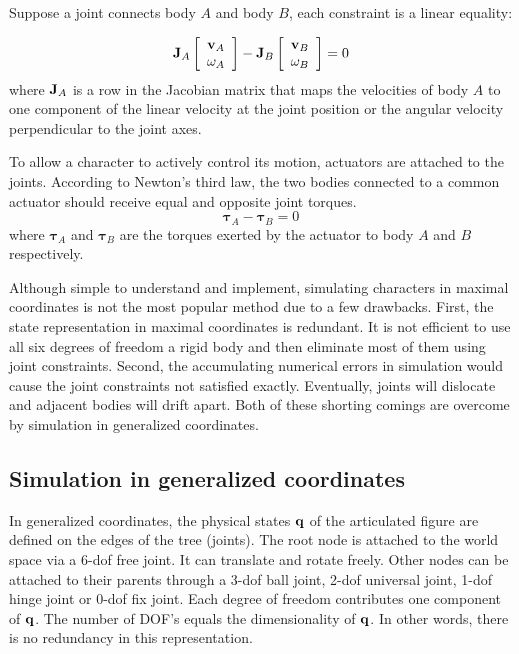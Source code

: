 Suppose a joint connects body $A$ and body $B$, each constraint is a linear equality:

\begin{equation}
\vc{J}_A
\left[\begin{array}{c}
\vc{v}_A \\
\vc{\omega}_A
\end{array}\right]-
\vc{J}_B
\left[\begin{array}{c}
\vc{v}_B \\
\vc{\omega}_B
\end{array}\right]
=0
\label{eq:jointConstraint}
\end{equation}
where $\mathbf{J}_A$ is a row in the Jacobian matrix that maps the velocities of body $A$ to one component of the linear velocity at the joint position or the angular velocity perpendicular to the joint axes.

To allow a character to actively control its motion, actuators are attached to the joints. According to Newton's third law, the two bodies connected to a common actuator should receive equal and opposite joint torques.
\begin{equation}
\boldsymbol{\tau}_A-\boldsymbol{\tau}_B=0
\label{eq:actuatorConstraint}
\end{equation}
where $\boldsymbol{\tau}_A$ and $\boldsymbol{\tau}_B$ are the torques exerted by the actuator to body $A$ and $B$ respectively.

Although simple to understand and implement, simulating characters in maximal coordinates is not the most popular method due to a few drawbacks. First, the state representation in  maximal coordinates is redundant. It is not efficient to use all six degrees of freedom a rigid body and then eliminate most of them using joint constraints. Second, the accumulating numerical errors in simulation would cause the joint constraints not satisfied exactly. Eventually, joints will dislocate and adjacent bodies will drift apart. Both of these shorting comings are overcome by simulation in generalized coordinates.

\subsection{Simulation in generalized coordinates}
In generalized coordinates, the physical states $\mathbf{q}$ of the articulated figure are defined on the edges of the tree (joints). The root node is attached to the world space via a 6-dof free joint. It can translate and rotate freely. Other nodes can be attached to their parents through a 3-dof ball joint, 2-dof universal joint, 1-dof hinge joint or 0-dof fix joint. Each degree of freedom contributes one component of $\mathbf{q}$. The number of DOF's equals the dimensionality of $\mathbf{q}$. In other words, there is no redundancy in this representation.

